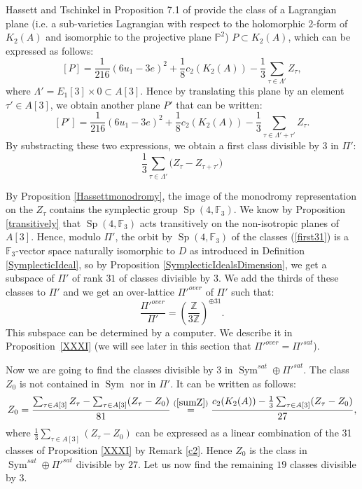 \documentclass{alggeom}
\DeclareMathOperator{\Sym}{Sym}
\DeclareMathOperator{\Sp}{Sp}
\newcommand{\kum}[2]{K_{ #2 }( #1 )}
\newcommand{\X}{\kum{A}{2}}
\newcommand{\cc}{c_2(\X)}
\newcommand{\Z}{\mathbb{Z}}
\theoremstyle{plain}
\theoremstyle{definition}
\theoremstyle{remark}
\begin{document}
Hassett and Tschinkel in Proposition 7.1 of \cite{Hassett} provide the class of a Lagrangian plane (i.e. a sub-varieties Lagrangian with respect to the holomorphic 2-form of $\X$ and isomorphic to the projective plane $\mathbb{P}^2$) $P\subset K_2(A)$, which can be expressed as follows:
\begin{equation}
\left[P\right]=\frac{1}{216}(6u_1-3e)^2+\frac{1}{8}\cc-\frac{1}{3}\sum_{\tau\in \Lambda'} Z_{\tau},
\label{LagrangianPlaneClass}
\end{equation}
where $\Lambda'=E_1[3]\times 0\subset A[3]$.
Hence by translating this plane by an element $\tau'\in A[3]$, we obtain another plane $P'$ that can be written:
$$\left[P'\right]=\frac{1}{216}(6u_1-3e)^2+\frac{1}{8}\cc-\frac{1}{3}\sum_{\tau\in \Lambda'+\tau'} Z_{\tau}.$$
By substracting these two expressions, we obtain a first class divisible by 3 in $\Pi'$:
\begin{equation}
 \frac{1}{3}\sum_{\tau\in\Lambda'} \Big(Z_{\tau} - Z_{\tau+\tau'}\Big)
 \label{first31}
\end{equation}

By Proposition \ref{Hassettmonodromy}, the image of the monodromy representation on the $Z_\tau$ contains the symplectic group $\Sp(4,\mathbb F_3)$. 
We know by Proposition \ref{transitively} that $\Sp(4,\mathbb F_3)$ acts transitively on the non-isotropic planes of $A[3]$. Hence, modulo $\Pi'$, the orbit by $\Sp(4,\mathbb F_3)$ of the classes (\ref{first31}) is a $\mathbb F_3$-vector space naturally isomorphic to $D$ as introduced in Definition \ref{SymplecticIdeal}, so by Proposition \ref{SymplecticIdealsDimension}, we get a subspace of $\Pi'$ of rank $31$ of classes divisible by $3$.
We add the thirds of these classes to $\Pi'$ and we get an over-lattice $\Pi'^{over}$ of $\Pi'$ such that:
\begin{equation}
 \frac{\Pi'^{over}}{\Pi'}=\left(\frac{\Z}{3\Z}\right)^{\oplus 31}.
 \label{Piover}
\end{equation}
This subspace can be determined by a computer. We describe it in Proposition~\ref{XXXI} (we will see later in this section that $\Pi'^{over}=\Pi'^{sat}$).  

Now we are going to find the classes divisible by 3 in $\Sym^{sat}\oplus \Pi'^{sat}$.
The class $Z_0$ is not contained in $\Sym$ nor in $\Pi'$.
It can be written as follows:
$$
Z_0=\frac{\sum_{\tau\in A[3]}Z_\tau-\sum_{\tau\in A[3]}(Z_\tau-Z_0)}{81}
\stackrel{(\ref{sumZ})}{=} \frac{c_2(K_2(A))-\frac{1}{3}\sum_{\tau\in A[3]}(Z_\tau-Z_0)}{27},
$$
where $\frac{1}{3}\sum_{\tau\in A[3]}(Z_\tau-Z_0)$ can be expressed as a linear combination of the 31 classes of Proposition \ref{XXXI} by Remark \ref{c2}.
Hence $Z_0$ is the class in $\Sym^{sat}\oplus \Pi'^{sat}$ divisible by $27$. 
Let us now find the remaining $19$ classes divisible by $3$.
\end{document}
